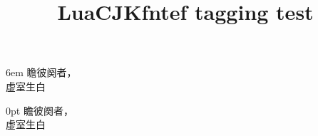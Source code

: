 \documentclass{article}
\title{LuaCJKfntef tagging test}
\begin{document}
\begin{CJKfilltwosides}{6em}
瞻彼阕者，\\虚室生白
\end{CJKfilltwosides}

\begin{CJKfilltwosides*}{0pt}
瞻彼阕者，\\虚室生白
\end{CJKfilltwosides*}






\end{document}
